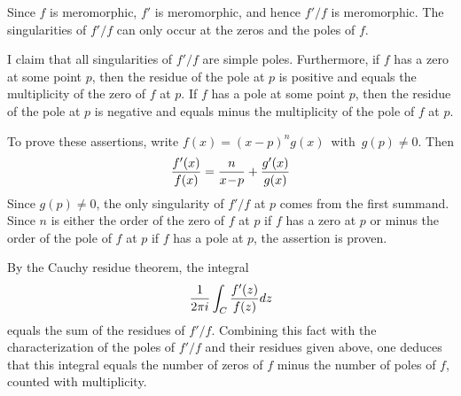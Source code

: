 \documentclass[12pt]{article}
\begin{document}
Since $f$ is meromorphic, $f'$ is meromorphic, and hence $f'/f$ is meromorphic.  The singularities of $f'/f$ can only occur at the zeros and the poles of $f$.

I claim that all singularities of $f'/f$ are simple poles.  Furthermore, if $f$ has a zero at some point $p$, then the residue of the pole at $p$ is positive and equals the multiplicity of the zero of $f$ at $p$.  If $f$ has a pole at some point $p$, then the residue of the pole at $p$ is negative and equals minus the multiplicity of the pole of $f$ at $p$.

To prove these assertions, write\! $f(x) = (x\!-\!p)^n g(x)$\, with\, $g(p) \neq 0$.  Then
 $${f'(x) \over f(x)} = {n \over x\!-\!p} + {g'(x) \over g(x)}$$
Since $g(p) \neq 0$, the only singularity of $f'\!/\!f$ at $p$ comes from the first summand.  Since $n$ is either the order of the zero of $f$ at $p$ if $f$ has a zero at $p$ or minus the order of the pole of $f$ at $p$ if $f$ has a pole at $p$, the assertion is proven.

By the Cauchy residue theorem, the integral
 $${1 \over 2 \pi i} \int_C {f'(z) \over f(z)} dz$$
equals the sum of the residues of $f'/f$.  Combining this fact with the characterization of the poles of $f'/f$ and their residues given above, one deduces that this integral equals the number of zeros of $f$ minus the number of poles of $f$, counted with multiplicity.

\end{document}
